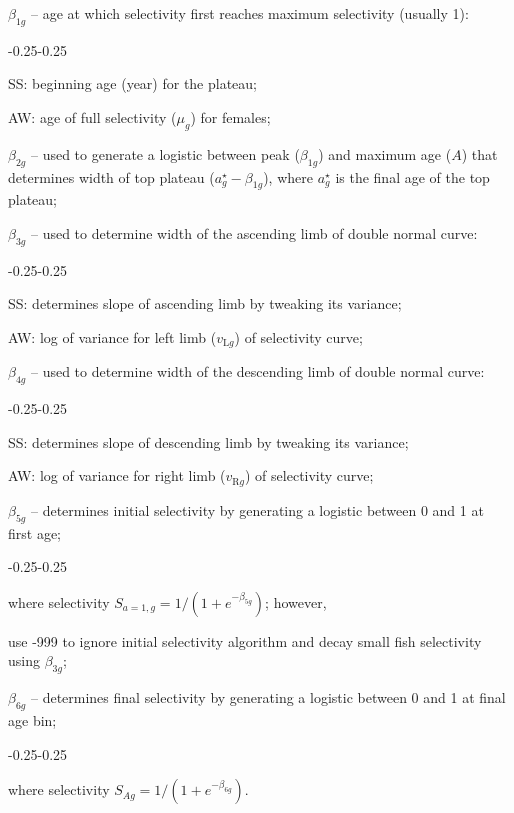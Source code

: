 \documentclass[11pt]{book}
\newcommand{\mr}[1]{\mathrm{#1}}
\begin{document}
\begin{enumerate_itemize}{}{}
  \item $\beta_{1g}$ -- age at which selectivity first reaches maximum selectivity (usually 1):
    \begin{enumerate_itemize}{-0.25}{-0.25}
      \item SS: beginning age (year) for the plateau;
      \item AW: age of full selectivity ($\mu_g$) for females;
    \end{enumerate_itemize}
  \item $\beta_{2g}$ -- used to generate a logistic between peak ($\beta_{1g}$) and maximum age ($A$) that determines width of top plateau ($a_g^{\star} - \beta_{1g}$), where $a_g^{\star}$ is the final age of the top plateau;
  \item $\beta_{3g}$ -- used to determine width of the ascending limb of double normal curve:
    \begin{enumerate_itemize}{-0.25}{-0.25}
      \item SS: determines slope of ascending limb by tweaking its variance;
      \item AW: log of variance for left limb ($v_{\mr{L}g}$) of selectivity curve;
    \end{enumerate_itemize}
  \item $\beta_{4g}$ -- used to determine width of the descending limb of double normal curve:
    \begin{enumerate_itemize}{-0.25}{-0.25}
      \item SS: determines slope of descending limb by tweaking its variance;
      \item AW: log of variance for right limb ($v_{\mr{R}g}$) of selectivity curve;
    \end{enumerate_itemize}
  \item $\beta_{5g}$ -- determines initial selectivity by generating a logistic between 0 and 1 at first age;
    \begin{enumerate_itemize}{-0.25}{-0.25}
      \item where selectivity $S_{a{=}1,g} = 1/(1+e^{-\beta_{5g}})$; however,
      \item use -999 to ignore initial selectivity algorithm and decay small fish selectivity using $\beta_{3g}$;
    \end{enumerate_itemize}
  \item $\beta_{6g}$ -- determines final selectivity by generating a logistic between 0 and 1 at final age bin;
    \begin{enumerate_itemize}{-0.25}{-0.25}
      \item where selectivity $S_{Ag} = 1/(1+e^{-\beta_{6g}})$.
    \end{enumerate_itemize}
\end{enumerate_itemize}
\end{document}
